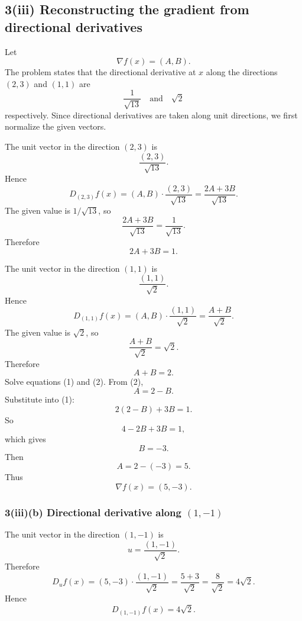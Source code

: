 \documentclass[11pt]{article}
\newcommand{\grad}{\nabla}
\begin{document}
\begin{center}
\end{center}

\subsection*{3(iii) Reconstructing the gradient from directional derivatives}
Let
\[
 \grad f(x)=(A,B).
\]
The problem states that the directional derivative at $x$ along the directions $(2,3)$ and $(1,1)$ are
\[
 \frac1{\sqrt{13}}
 \quad\text{and}\quad
 \sqrt2
\]
respectively.  Since directional derivatives are taken along unit directions, we first normalize the given vectors.

The unit vector in the direction $(2,3)$ is
\[
 \frac{(2,3)}{\sqrt{13}}.
\]
Hence
\[
 D_{(2,3)}f(x)
 = (A,B)\cdot\frac{(2,3)}{\sqrt{13}}
 =\frac{2A+3B}{\sqrt{13}}.
\]
The given value is $1/\sqrt{13}$, so
\[
 \frac{2A+3B}{\sqrt{13}}=\frac1{\sqrt{13}}.
\]
Therefore
\[
 2A+3B=1. \tag{1}
\]

The unit vector in the direction $(1,1)$ is
\[
 \frac{(1,1)}{\sqrt2}.
\]
Hence
\[
 D_{(1,1)}f(x)
 =(A,B)\cdot\frac{(1,1)}{\sqrt2}
 =\frac{A+B}{\sqrt2}.
\]
The given value is $\sqrt2$, so
\[
 \frac{A+B}{\sqrt2}=\sqrt2.
\]
Therefore
\[
 A+B=2. \tag{2}
\]
Solve equations (1) and (2).  From (2),
\[
 A=2-B.
\]
Substitute into (1):
\[
 2(2-B)+3B=1.
\]
So
\[
 4-2B+3B=1,
\]
which gives
\[
 B=-3.
\]
Then
\[
 A=2-(-3)=5.
\]
Thus
\[
 \boxed{\grad f(x)=(5,-3).}
\]

\subsubsection*{3(iii)(b) Directional derivative along $(1,-1)$}
The unit vector in the direction $(1,-1)$ is
\[
 u=\frac{(1,-1)}{\sqrt2}.
\]
Therefore
\[
 D_u f(x)=(5,-3)\cdot\frac{(1,-1)}{\sqrt2}
 =\frac{5+3}{\sqrt2}
 =\frac8{\sqrt2}
 =4\sqrt2.
\]
Hence
\[
 \boxed{D_{(1,-1)}f(x)=4\sqrt2.}
\]
\end{document}
